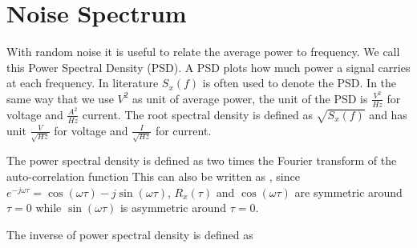 \documentclass[final,a4paper]{IEEEtran}
\begin{document}
\section{Noise Spectrum}
With random noise it is useful to relate the average power to
frequency. We call this Power Spectral Density (PSD). A PSD plots how
much power a signal carries at each frequency. In literature $S_x(f)$
is often used to denote the PSD. In the same way
that we use $V^2$ as unit of average power, the unit of the PSD is
$\frac{V^2}{Hz}$ for voltage and $\frac{A^2}{Hz}$ current. The root
spectral density is defined as $\sqrt{S_x(f)}$ and has unit
$\frac{V}{\sqrt{Hz}}$ for voltage and $\frac{I}{\sqrt{Hz}}$ for
current. 


The power spectral density is defined as two times the Fourier transform of the
auto-correlation function \cite{ziel}
This can also be written as 
, since $e^{-j\omega \tau} = \cos(\omega \tau) - j \sin (\omega
  \tau)$,  $R_x(\tau)$ and $\cos(\omega \tau)$ are symmetric around
  $\tau=0$ while $\sin(\omega \tau)$ is asymmetric around $\tau = 0$.

The inverse of power spectral density is defined as
\end{document}
